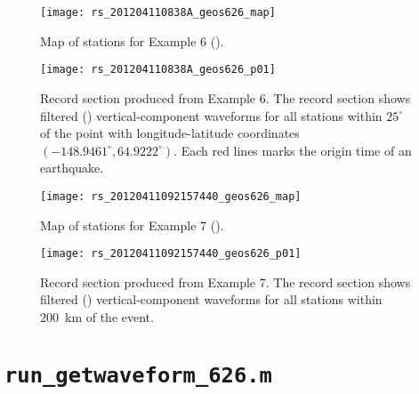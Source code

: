 \documentclass[11pt,titlepage,fleqn]{article}
\begin{document}

\clearpage\pagebreak
\begin{figure}
\centering
\texttt{[image: rs\_201204110838A\_geos626\_map]}
\caption[]
{{
Map of stations for Example 6 ().
}}
\label{fig:map_ex06}
\end{figure}

\clearpage\pagebreak
\begin{figure}
\hspace{-1.25cm}
\texttt{[image: rs\_201204110838A\_geos626\_p01]}
\caption[]
{{
Record section produced from Example 6.
The record section shows filtered () vertical-component waveforms for all stations within $25^\circ$ of the point with longitude-latitude coordinates $(-148.9461^\circ, 64.9222^\circ)$. Each red lines marks the origin time of an earthquake.
}}
\label{fig:rs_ex06}
\end{figure}


\clearpage\pagebreak
\begin{figure}
\centering
\texttt{[image: rs\_20120411092157440\_geos626\_map]}
\caption[]
{{
Map of stations for Example 7 ().
}}
\label{fig:map_ex07}
\end{figure}

\clearpage\pagebreak
\begin{figure}
\hspace{-1.25cm}
\texttt{[image: rs\_20120411092157440\_geos626\_p01]}
\caption[]
{{
Record section produced from Example 7.
The record section shows filtered () vertical-component waveforms for all stations within 200~km of the event.
}}
\label{fig:rs_ex07}
\end{figure}


\iffalse

\appendix

\clearpage\pagebreak

\section{{\tt run\_getwaveform\_626.m}}
\label{sec:script}
\end{document}
